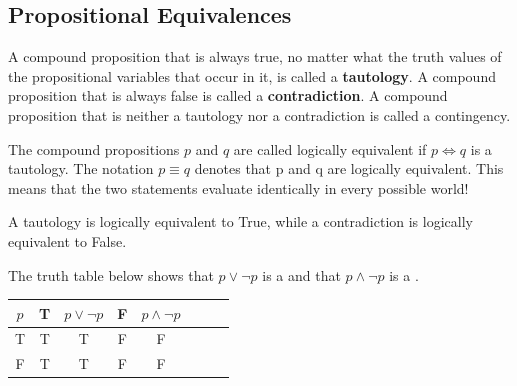 \newpage

\subsection{Propositional Equivalences}

\begin{defn}

A compound proposition that is always true, no matter what the truth values of the propositional
variables that occur in it, is called a \textbf{tautology}. A compound proposition that is always
false is called a \textbf{contradiction}. A compound proposition that is neither a tautology nor a
contradiction is called a contingency.

\end{defn}
\begin{defn}[equivalence]
The compound propositions $p$ and $q$ are called logically equivalent if $p \iff q$ is a tautology.
The notation $p \equiv q$ denotes that p and q are logically equivalent. This means that the two statements evaluate identically in every possible world!
\end{defn}
\begin{exmp}[tautology]
A tautology is logically equivalent to True, while a contradiction is logically equivalent to False.

The truth table below shows that $p \lor \lnot p$ is a  and that $p \land \lnot p$ is a .
\begin{center} 
\begin{tabular}{ | c | c | c |c |c |c |c |c |} 
  \hline
 $p$ & T & $ p \lor \lnot p$&F & $p \land \lnot p$\\
 \hline
  T &T  &T&F&F\\ 
  F & T & T&F&F\\ 
  \hline
\end{tabular}
\end{center}
\end{exmp}

